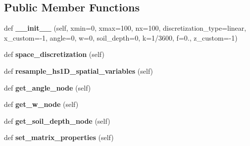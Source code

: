 \subsection*{Public Member Functions}
\begin{DoxyCompactItemize}
\item 
\hypertarget{class_space_discretization_1_1_space_discretization_a94bdc19a1fe63274df51b12fe7246610}{}\label{class_space_discretization_1_1_space_discretization_a94bdc19a1fe63274df51b12fe7246610} 
def {\bfseries \+\_\+\+\_\+init\+\_\+\+\_\+} (self, xmin=0, xmax=100, nx=100, discretization\+\_\+type=\textquotesingle{}linear\textquotesingle{}, x\+\_\+custom=-\/1, angle=0, w=0, soil\+\_\+depth=0, k=1/3600, f=0., z\+\_\+custom=-\/1)
\item 
\hypertarget{class_space_discretization_1_1_space_discretization_a5ef3a4f5840313a04d3d2436a0183b09}{}\label{class_space_discretization_1_1_space_discretization_a5ef3a4f5840313a04d3d2436a0183b09} 
def {\bfseries space\+\_\+discretization} (self)
\item 
\hypertarget{class_space_discretization_1_1_space_discretization_afd04c500dbe8f21216fd59bff419e5d2}{}\label{class_space_discretization_1_1_space_discretization_afd04c500dbe8f21216fd59bff419e5d2} 
def {\bfseries resample\+\_\+hs1\+D\+\_\+spatial\+\_\+variables} (self)
\item 
\hypertarget{class_space_discretization_1_1_space_discretization_a0ebc4de16ce20df8aecc95011db8b3da}{}\label{class_space_discretization_1_1_space_discretization_a0ebc4de16ce20df8aecc95011db8b3da} 
def {\bfseries get\+\_\+angle\+\_\+node} (self)
\item 
\hypertarget{class_space_discretization_1_1_space_discretization_a54803482692a79a53166ab249e7423d4}{}\label{class_space_discretization_1_1_space_discretization_a54803482692a79a53166ab249e7423d4} 
def {\bfseries get\+\_\+w\+\_\+node} (self)
\item 
\hypertarget{class_space_discretization_1_1_space_discretization_a35f1ce4aa220ecfa59ca1b00154a7b1c}{}\label{class_space_discretization_1_1_space_discretization_a35f1ce4aa220ecfa59ca1b00154a7b1c} 
def {\bfseries get\+\_\+soil\+\_\+depth\+\_\+node} (self)
\item 
\hypertarget{class_space_discretization_1_1_space_discretization_a5451b90853a74e7cd628f3ff1e6c447d}{}\label{class_space_discretization_1_1_space_discretization_a5451b90853a74e7cd628f3ff1e6c447d} 
def {\bfseries set\+\_\+matrix\+\_\+properties} (self)
\item 
\hypertarget{class_space_discretization_1_1_space_discretization_ad9030cbe32bfe65a88357d13a5343d45}{}\label{class_space_discretization_1_1_space_discretization_ad9030cbe32bfe65a88357d13a5343d45} 

\end{DoxyCompactItemize}
